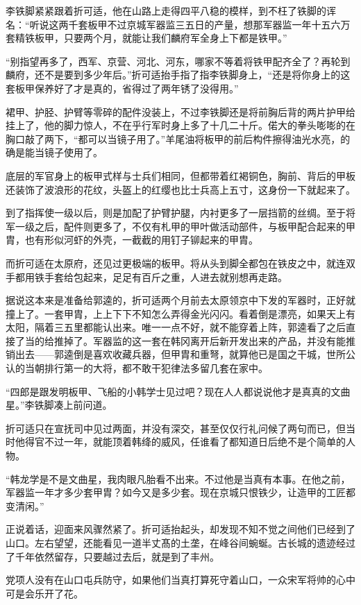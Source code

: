 李铁脚紧紧跟着折可适，他在山路上走得四平八稳的模样，到不枉了铁脚的诨名：“听说这两千套板甲不过京城军器监三五日的产量，想那军器监一年十五六万套精铁板甲，只要两个月，就能让我们麟府军全身上下都是铁甲。”

“别指望再多了，西军、京营、河北、河东，哪家不等着将铁甲配齐全了？再轮到麟府，还不是要到多少年后。”折可适抬手指了指李铁脚身上，“还是将你身上的这套板甲保养好了才是真的，省得过了两年锈了没得用。”

裙甲、护胫、护臂等零碎的配件没装上，不过李铁脚还是将前胸后背的两片护甲给挂上了，他的脚力惊人，不在乎行军时身上多了十几二十斤。偌大的拳头嘭嘭的在胸口敲了两下，“都可以当镜子用了。”羊尾油将板甲的前后构件擦得油光水亮，的确是能当镜子使用了。

底层的军官身上的板甲式样与士兵们相同，但都带着红褐铜色，胸前、背后的甲板还装饰了波浪形的花纹，头盔上的红缨也比士兵高上五寸，这身份一下就起来了。

到了指挥使一级以后，则是加配了护臂护腿，内衬更多了一层挡箭的丝绸。至于将军一级之后，配件则更多了，不仅有札甲的甲叶做活动部件，与板甲配合起来的甲胄，也有形似河虾的外壳，一截截的用钉子铆起来的甲胄。

而折可适在太原府，还见过更极端的板甲。将从头到脚全都包在铁皮之中，就连双手都用铁手套给包起来，足足有百斤之重，人进去就别想再走路。

据说这本来是准备给郭逵的，折可适两个月前去太原领京中下发的军器时，正好就撞上了。一套甲胄，上上下下不知怎么弄得金光闪闪。看着倒是漂亮，如果天上有太阳，隔着三五里都能认出来。唯一一点不好，就不能穿着上阵，郭逵看了之后直接了当的给推掉了。军器监的这一套在韩冈离开后新开发出来的产品，并没有能推销出去——郭逵倒是喜欢收藏兵器，但甲胄和重弩，就算他已是国之干城，世所公认的当朝排行第一的大将，都不敢干犯律法多留几套在家中。

“四郎是跟发明板甲、飞船的小韩学士见过吧？现在人人都说说他才是真真的文曲星。”李铁脚凑上前问道。

折可适只在宣抚司中见过两面，并没有深交，甚至仅仅行礼问候了两句而已，但当时他得官不过一年，就能顶着韩绛的威风，任谁看了都知道日后绝不是个简单的人物。

“韩龙学是不是文曲星，我肉眼凡胎看不出来。不过他是当真有本事。在他之前，军器监一年才多少套甲胄？如今又是多少套。现在京城只恨铁少，让造甲的工匠都变清闲。”

正说着话，迎面来风骤然紧了。折可适抬起头，却发现不知不觉之间他们已经到了山口。左右望望，还能看见一道半丈髙的土垄，在峰谷间蜿蜒。古长城的遗迹经过了千年依然留存，只要越过去后，就是到了丰州。

党项人没有在山口屯兵防守，如果他们当真打算死守着山口，一众宋军将帅的心中可是会乐开了花。

